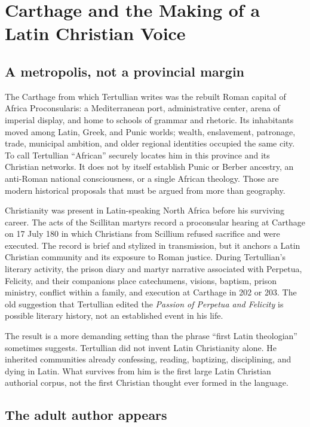 \section{Carthage and the Making of a Latin Christian Voice}

\subsection{A metropolis, not a provincial margin}

The Carthage from which Tertullian writes was the rebuilt Roman capital of
Africa Proconsularis: a Mediterranean port, administrative center, arena of
imperial display, and home to schools of grammar and rhetoric. Its inhabitants
moved among Latin, Greek, and Punic worlds; wealth, enslavement, patronage,
trade, municipal ambition, and older regional identities occupied the same
city. To call Tertullian ``African'' securely locates him in this province and
its Christian networks. It does not by itself establish Punic or Berber
ancestry, an anti-Roman national consciousness, or a single African theology.
Those are modern historical proposals that must be argued from more than
geography.

Christianity was present in Latin-speaking North Africa before his surviving
career. The acts of the Scillitan martyrs record a proconsular hearing at
Carthage on 17 July 180 in which Christians from Scillium refused sacrifice and
were executed. The record is brief and stylized in transmission, but it anchors
a Latin Christian community and its exposure to Roman justice. During
Tertullian's literary activity, the prison diary and martyr narrative associated
with Perpetua, Felicity, and their companions place catechumens, visions,
baptism, prison ministry, conflict within a family, and execution at Carthage
in 202 or 203. The old suggestion that Tertullian edited the \emph{Passion of
Perpetua and Felicity} is possible literary history, not an established event
in his life.

The result is a more demanding setting than the phrase ``first Latin
theologian'' sometimes suggests. Tertullian did not invent Latin Christianity
alone. He inherited communities already confessing, reading, baptizing,
disciplining, and dying in Latin. What survives from him is the first large
Latin Christian authorial corpus, not the first Christian thought ever formed
in the language.

\subsection{The adult author appears}


